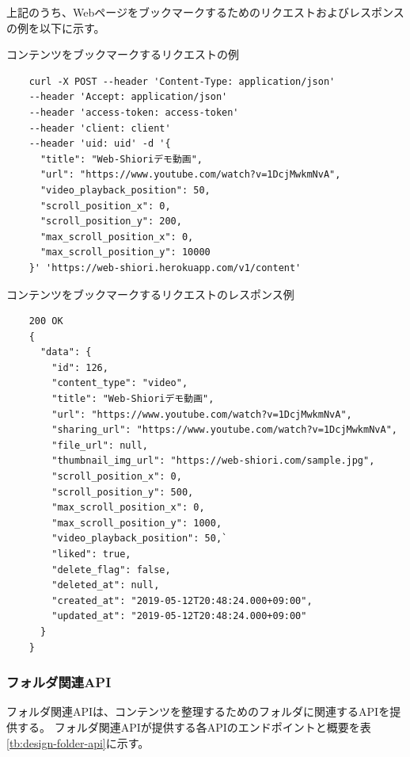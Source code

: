 上記のうち、Webページをブックマークするためのリクエストおよびレスポンスの例を以下に示す。

\begin{itembox}[l]{コンテンツをブックマークするリクエストの例}
  \label{content-request-curl}
  \begin{verbatim}
    curl -X POST --header 'Content-Type: application/json' 
    --header 'Accept: application/json' 
    --header 'access-token: access-token' 
    --header 'client: client' 
    --header 'uid: uid' -d '{
      "title": "Web-Shioriデモ動画",
      "url": "https://www.youtube.com/watch?v=1DcjMwkmNvA",
      "video_playback_position": 50,
      "scroll_position_x": 0,
      "scroll_position_y": 200,
      "max_scroll_position_x": 0,
      "max_scroll_position_y": 10000
    }' 'https://web-shiori.herokuapp.com/v1/content'
  \end{verbatim}
\end{itembox}

\begin{itembox}[l]{コンテンツをブックマークするリクエストのレスポンス例}
  \label{content-response-json}
  \begin{verbatim}
    200 OK
    {
      "data": {
        "id": 126,
        "content_type": "video",
        "title": "Web-Shioriデモ動画",
        "url": "https://www.youtube.com/watch?v=1DcjMwkmNvA",
        "sharing_url": "https://www.youtube.com/watch?v=1DcjMwkmNvA",
        "file_url": null,
        "thumbnail_img_url": "https://web-shiori.com/sample.jpg",
        "scroll_position_x": 0,
        "scroll_position_y": 500,
        "max_scroll_position_x": 0,
        "max_scroll_position_y": 1000,
        "video_playback_position": 50,`
        "liked": true,
        "delete_flag": false,
        "deleted_at": null,
        "created_at": "2019-05-12T20:48:24.000+09:00",
        "updated_at": "2019-05-12T20:48:24.000+09:00"
      }
    }
  \end{verbatim}
\end{itembox}

\subsubsection{フォルダ関連API}
フォルダ関連APIは、コンテンツを整理するためのフォルダに関連するAPIを提供する。
フォルダ関連APIが提供する各APIのエンドポイントと概要を表\ref{tb:design-folder-api}に示す。

